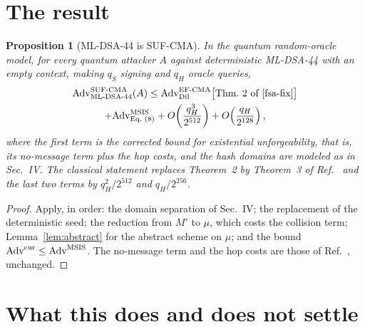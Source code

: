\documentclass[aps,prx,reprint,superscriptaddress,nofootinbib,floatfix]{revtex4-2}
\newtheorem{proposition}{Proposition}
\theoremstyle{remark}
\newcommand{\Adv}{\mathrm{Adv}}
\begin{document}
\section{The result}

\begin{proposition}[ML-DSA-44 is SUF-CMA]\label{prop:suf}
In the quantum random-oracle model, for every quantum attacker $A$ against deterministic ML-DSA-44 with an empty context, making $q_S$ signing and $q_H$ oracle queries,
\begin{multline*}
\Adv^{\rm SUF\text{-}CMA}_{\text{ML-DSA-44}}(A)\le\Adv^{\rm EF\text{-}CMA}_{\rm Dil}\bigl[\text{Thm.~2 of \cite{fsa-fix}}\bigr]\\
+\Adv^{\rm MSIS}_{\text{Eq.~(8)}}+O\!\left(\frac{q_H^3}{2^{512}}\right)+O\!\left(\frac{q_H}{2^{128}}\right),
\end{multline*}
where the first term is the corrected bound for existential unforgeability, that is, its no-message term plus the hop costs, and the hash domains are modeled as in Sec.~IV. The classical statement replaces Theorem~2 by Theorem~3 of Ref.~\cite{fsa-fix} and the last two terms by $q_H^2/2^{512}$ and $q_H/2^{256}$.
\end{proposition}
\begin{proof}
Apply, in order: the domain separation of Sec.~IV; the replacement of the deterministic seed; the reduction from $M'$ to $\mu$, which costs the collision term; Lemma~\ref{lem:abstract} for the abstract scheme on $\mu$; and the bound $\Adv^{\rm cur}\le\Adv^{\rm MSIS}$. The no-message term and the hop costs are those of Ref.~\cite{fsa-fix}, unchanged.
\end{proof}

\section{What this does and does not settle}
\end{document}
